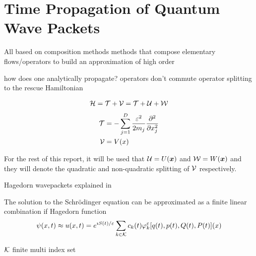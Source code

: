 





\clearemptydoublepage

\mbox{}
\vfill

\vfill
\tableofcontents

\clearpage

\listoffigures
\listofalgorithms

\clearemptydoublepage 
\clearpage
\section{Time Propagation of Quantum Wave Packets}
\label{sec:timeprop}
%

All based on composition methods
methods that compose elementary flows/operators to build an approximation of high order

how does one analytically propagate?
operators don't commute
operator splitting to the rescue
Hamiltonian

\begin{align}
	\mathcal{H} = \mathcal{T} + \mathcal{V} = \mathcal{T} + \mathcal{U} + \mathcal{W}
\end{align}
\begin{align}
	\mathcal{T} &= - \sum_{j=1}^D \frac{\varepsilon^2}{2m_j} \frac{\partial^2}{\partial x_j^2} \\
	\mathcal{V} &= V(x)
\end{align}

For the rest of this report, it will be used that $\mathcal{U} = U(\bm{x})$ and $\mathcal{W} = W(\bm{x})$ and they will denote the quadratic and non-quadratic splitting of $\mathcal{V}$ respectively.
\par\medskip
%

Hagedorn wavepackets explained in \cite{FGL_semiclassical_dynamics}

The solution to the Schrödinger equation can be approximated as a finite linear combination if Hagedorn function \cite{FGL_semiclassical_dynamics}
\begin{align}
	\label{math:hagedornwp}
	\psi(x,t) \approx u(x,t)
	= e^{\imath S(t)/\varepsilon} \sum_{k \in \mathcal{K}} c_k(t) \varphi_k^{\varepsilon} [ q(t),p(t),Q(t),P(t) ] (x)
\end{align}

$\mathcal{K}$ finite multi index set

